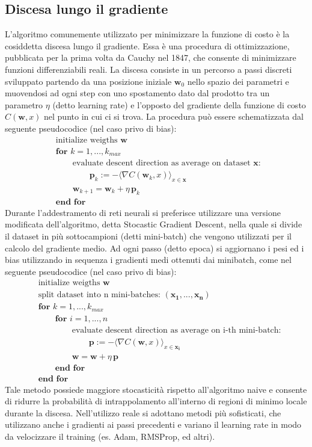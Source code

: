 \documentclass[a4paper]{article}
\begin{document}
\subsection{Discesa lungo il gradiente}
L'algoritmo comunemente utilizzato per minimizzare la funzione di costo è la cosiddetta discesa lungo il gradiente. Essa è una procedura di ottimizzazione, pubblicata per la prima volta da Cauchy nel 1847, che consente di minimizzare funzioni differenziabili reali. La discesa consiste in un percorso a passi discreti sviluppato partendo da una posizione iniziale $\mathbf{w}_0$ nello spazio dei parametri e muovendosi ad ogni step con uno spostamento dato dal prodotto tra un parametro $\eta$ (detto learning rate) e l'opposto del gradiente della funzione di costo $C(\mathbf{w}, x)$ nel punto in cui ci si trova.
La procedura può essere schematizzata dal seguente pseudocodice (nel caso privo di bias):
\begin{align*}
& \text{initialize weigths } \mathbf{w}\\
& \textbf{for } k = 1,..., k_{max} \\
&\qquad \text{evaluate descent direction as average on dataset }\mathbf{x}\text{: } \\
& \qquad  \qquad \mathbf {p} _{k}:=- \langle \nabla C(\mathbf {w} _{k}, x) \rangle_{x \in \mathbf{x}}\\
&\qquad \mathbf {w} _{k+1}=\mathbf {w} _{k}+ \eta \, \mathbf {p} _{k}\\
&\textbf{end for}
\end{align*}
Durante l'addestramento di reti neurali si preferisce utilizzare una versione modificata dell'algoritmo, detta Stocastic Gradient Descent, nella quale si divide il dataset in più sottocampioni (detti mini-batch) che vengono utilizzati per il calcolo del gradiente medio. Ad ogni passo (detto epoca) si aggiornano i pesi ed i bias utilizzando in sequenza i gradienti medi ottenuti dai minibatch, come nel seguente pseudocodice (nel caso privo di bias):
\begin{align*}
& \text{initialize weigths } \mathbf{w}\\
& \text{split dataset into n mini-batches: }(\mathbf{x_1}, ..., \mathbf{x_n})\\
& \textbf{for } k = 1,..., k_{max} \\
& \qquad \textbf{for } i = 1,..., n \\
&\qquad \qquad {\text{evaluate descent direction as average on i-th mini-batch:}}\\
& \qquad \qquad \qquad \mathbf {p}:=- \langle \nabla C(\mathbf {w}, x)\rangle_{x \in \mathbf{x_i}} \\
&\qquad \qquad \mathbf {w}=\mathbf {w} + \eta \, \mathbf {p}\\
&\qquad \textbf{end for} \\
&\textbf{end for}
\end{align*} 
Tale metodo possiede maggiore stocasticità rispetto all'algoritmo naive e consente di ridurre la probabilità di intrappolamento all'interno di regioni di minimo locale durante la discesa.
Nell'utilizzo reale si adottano metodi più sofisticati, che utilizzano anche i gradienti ai passi precedenti e variano il learning rate in modo da velocizzare il training (es. Adam, RMSProp, ed altri).
\end{document}
